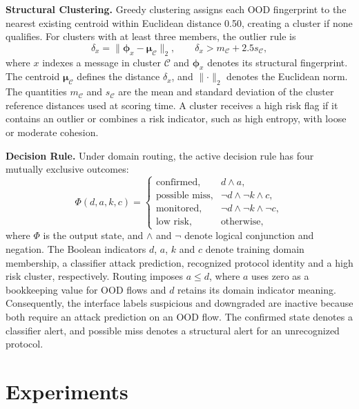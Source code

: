 \documentclass{article}
\begin{document}
\textbf{Structural Clustering.} Greedy clustering assigns each OOD fingerprint to
the nearest existing centroid within Euclidean distance 0.50, creating a cluster if
none qualifies. For clusters with at least three members, the outlier rule is
\begin{equation}
\delta_x=\lVert\boldsymbol{\phi}_x-\boldsymbol{\mu}_{\mathcal{C}}\rVert_2,
\qquad \delta_x>m_{\mathcal{C}}+2.5s_{\mathcal{C}},
\label{eq:outlier}
\end{equation}
where $x$ indexes a message in cluster $\mathcal{C}$ and
$\boldsymbol{\phi}_x$ denotes its structural fingerprint. The centroid
$\boldsymbol{\mu}_{\mathcal{C}}$ defines the distance $\delta_x$, and
$\lVert\cdot\rVert_2$ denotes the Euclidean norm. The quantities $m_{\mathcal{C}}$
and $s_{\mathcal{C}}$ are the mean and standard deviation of the cluster reference
distances used at scoring time. A cluster receives a high risk
flag if it contains an outlier or combines a risk indicator, such as high entropy,
with loose or moderate cohesion.

\textbf{Decision Rule.} Under domain routing, the active decision rule has four
mutually exclusive outcomes:
\begin{equation}
\Phi(d,a,k,c)=
\begin{cases}
\text{confirmed}, & d\wedge a,\\
\text{possible miss}, & \neg d\wedge\neg k\wedge c,\\
\text{monitored}, & \neg d\wedge\neg k\wedge\neg c,\\
\text{low risk}, & \text{otherwise},
\end{cases}
\label{eq:fusion}
\end{equation}
where $\Phi$ is the output state, and $\wedge$ and $\neg$ denote logical
conjunction and negation. The Boolean indicators $d$, $a$, $k$ and $c$ denote
training domain membership, a classifier attack prediction, recognized protocol
identity and a high risk cluster, respectively. Routing imposes $a\leq d$, where $a$ uses zero as a bookkeeping value
for OOD flows and $d$ retains its domain indicator meaning. Consequently,
the interface labels suspicious and downgraded are inactive because both require an
attack prediction on an OOD flow. The confirmed state denotes a classifier alert,
and possible miss denotes a structural alert for an unrecognized protocol.

\section{Experiments}
\label{sec:exp}
\end{document}
